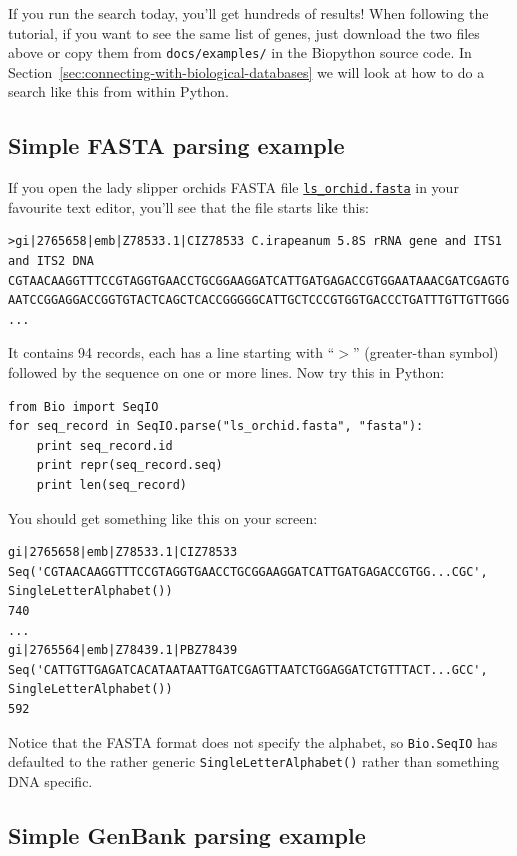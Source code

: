 \documentclass{report}
\begin{document}
If you run the search today, you'll get hundreds of results!  When following the tutorial, if you want to see the same list of genes, just download the two files above or copy them from \verb|docs/examples/| in the Biopython source code.  In Section~\ref{sec:connecting-with-biological-databases} we will look at how to do a search like this from within Python.

\subsection{Simple FASTA parsing example}
\label{sec:fasta-parsing}

If you open the lady slipper orchids FASTA file \href{http://biopython.org/DIST/docs/tutorial/examples/ls_orchid.fasta}{\tt ls\_orchid.fasta} in your favourite text editor, you'll see that the file starts like this:

\begin{verbatim}
>gi|2765658|emb|Z78533.1|CIZ78533 C.irapeanum 5.8S rRNA gene and ITS1 and ITS2 DNA
CGTAACAAGGTTTCCGTAGGTGAACCTGCGGAAGGATCATTGATGAGACCGTGGAATAAACGATCGAGTG
AATCCGGAGGACCGGTGTACTCAGCTCACCGGGGGCATTGCTCCCGTGGTGACCCTGATTTGTTGTTGGG
...
\end{verbatim}

It contains 94 records, each has a line starting with ``$>$'' (greater-than symbol) followed by the sequence on one or more lines.  Now try this in Python:

\begin{verbatim}
from Bio import SeqIO
for seq_record in SeqIO.parse("ls_orchid.fasta", "fasta"):
    print seq_record.id
    print repr(seq_record.seq)
    print len(seq_record)
\end{verbatim}

\noindent You should get something like this on your screen:

\begin{verbatim}
gi|2765658|emb|Z78533.1|CIZ78533
Seq('CGTAACAAGGTTTCCGTAGGTGAACCTGCGGAAGGATCATTGATGAGACCGTGG...CGC', SingleLetterAlphabet())
740
...
gi|2765564|emb|Z78439.1|PBZ78439
Seq('CATTGTTGAGATCACATAATAATTGATCGAGTTAATCTGGAGGATCTGTTTACT...GCC', SingleLetterAlphabet())
592
\end{verbatim}

Notice that the FASTA format does not specify the alphabet, so \verb|Bio.SeqIO| has defaulted to the rather generic \verb|SingleLetterAlphabet()| rather than something DNA specific.

\subsection{Simple GenBank parsing example}
\end{document}
